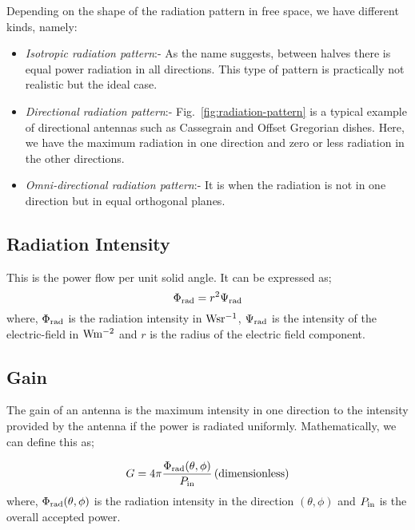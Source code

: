 Depending on the shape of the radiation pattern in free space, we have different kinds, namely:
 \begin{itemize}
  \item \emph{Isotropic radiation pattern}:- As the name suggests, between halves there is equal power radiation in all directions. This type of pattern is practically not realistic 
  but the ideal case.
  \item \emph{Directional radiation pattern}:- Fig.~\ref{fig:radiation-pattern} is a typical example of directional antennas such as Cassegrain and Offset Gregorian dishes. 
  Here, we have the maximum radiation  in one direction and zero or less radiation in the other directions.
   \item \emph{Omni-directional radiation pattern}:- It is when the radiation is not in one direction but in equal orthogonal planes.
 \end{itemize}

\subsection{Radiation Intensity}	   \label{chap2:RadiationIntensity}
This is the power flow per unit solid angle. It can be expressed as;
\begin{equation} \label{eq:rad_intensity}
   \Phi_{\rm rad} = r^{2}\Psi_{\rm rad}    %
 \end{equation} 
 where, $ \Phi_{\rm rad}$ is the radiation intensity  in $\rm Wsr^{-1}$, $\Psi_{\rm rad}$ is the intensity of the electric-field in $\rm Wm^{-2}$ and
 $r $ is the radius of the electric field component.

\subsection{Gain}	   \label{chap2:gain}
The gain of an antenna is the maximum intensity in one direction to the intensity provided by the antenna if the power is radiated uniformly. Mathematically, we can define
this as;

\begin{equation}  \label{eq:gain}
   G = 4\pi\frac{ \Phi_{\rm rad}(\theta, \phi)}{P_{\rm in}}\, \mbox{(dimensionless)}    
 \end{equation} 
where, $\Phi_{\rm rad}(\theta, \phi)$ is the radiation intensity in the direction $(\theta, \phi)$ and $P_{\rm in}$ is the overall accepted power. 

